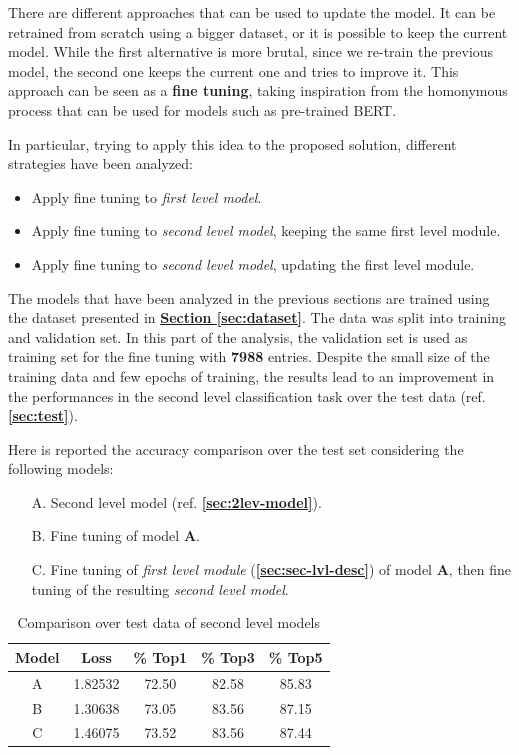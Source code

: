 \documentclass[12pt]{article}
\begin{document}
There are different approaches that can be used to update the model. It can be retrained from scratch using a bigger dataset, or it is possible to keep the current model. While the first alternative is more brutal, since we re-train the previous model, the second one keeps the current one and tries to improve it. This approach can be seen as a \textbf{fine tuning}, taking inspiration from the homonymous process that can be used for models such as pre-trained BERT.

In particular, trying to apply this idea to the proposed solution, different strategies have been analyzed:
\begin{itemize}
    \item Apply fine tuning to \textit{first level model}.
    \item Apply fine tuning to \textit{second level model}, keeping the same first level module.
    \item Apply fine tuning to \textit{second level model}, updating the first level module.
\end{itemize}

The models that have been analyzed in the previous sections are trained using the dataset presented in \hyperref[sec:dataset]{\textbf{Section \ref{sec:dataset}}}. The data was split into training and validation set. In this part of the analysis, the validation set is used as training set for the fine tuning with \textbf{7988} entries. Despite the small size of the training data and few epochs of training, the results lead to an improvement in the performances in the second level classification task over the test data (ref. \textbf{\ref{sec:test}}).

Here is reported the accuracy comparison over the test set considering the following models:
\begin{itemize}
    \item [A.] Second level model (ref. \textbf{\ref{sec:2lev-model}}).
    \item [B.] Fine tuning of model \textbf{A}.
    \item [C.] Fine tuning of \textit{first level module} (\textbf{\ref{sec:sec-lvl-desc}}) of model \textbf{A}, then fine tuning of the resulting \textit{second level model}.
\end{itemize}
\begin{table}[ht!]
    \begin{adjustwidth}{}{}
	    \centering
	    \small
	    \begin{tabular}{ |c|c|c|c|c| }
        \hline
        \textbf{Model} & \textbf{Loss} & \textbf{\% Top1} & \textbf{\% Top3} & \textbf{\% Top5} \\
        \hline
        A & 1.82532 & 72.50 & 82.58 & 85.83 \\
        B & 1.30638 & 73.05 & 83.56 & 87.15 \\
        C & 1.46075 & 73.52 & 83.56 & 87.44 \\
        \hline
        \end{tabular}
        \captionsetup{justification = centering, singlelinecheck=false, margin=3cm}
	    \label{tb:finetuning}
    \end{adjustwidth}
    \caption{Comparison over test data of second level models}
\end{table}
\newpage
\end{document}
